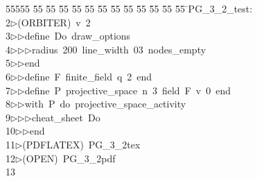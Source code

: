 %
%
\begin{tabbing}
55555 \= 55 \= 55 \= 55 \= 55 \= 55 \= 55 \= 55 \= 55 \= 55 \= 55 \= 55 \= 55 \= \>PG\_3\_2\_test:\\[0pt]
2\>$\triangleright$\>(ORBITER)\ v\ 2\ \\[0pt]
3\>$\triangleright$\>$\triangleright$\>define\ Do\ draw\_options\ \\[0pt]
4\>$\triangleright$\>$\triangleright$\>$\triangleright$\>radius\ 200\ line\_width\ 03\ nodes\_empty\ \\[0pt]
5\>$\triangleright$\>$\triangleright$\>end\ \\[0pt]
6\>$\triangleright$\>$\triangleright$\>define\ F\ finite\_field\ q\ 2\ end\ \\[0pt]
7\>$\triangleright$\>$\triangleright$\>define\ P\ projective\_space\ n\ 3\ field\ F\ v\ 0\ end\ \\[0pt]
8\>$\triangleright$\>$\triangleright$\>with\ P\ do\ projective\_space\_activity\ \\[0pt]
9\>$\triangleright$\>$\triangleright$\>$\triangleright$\>cheat\_sheet\ Do\ \\[0pt]
10\>$\triangleright$\>$\triangleright$\>end\\[0pt]
11\>$\triangleright$\>(PDFLATEX)\ PG\_3\_2tex\\[0pt]
12\>$\triangleright$\>(OPEN)\ PG\_3\_2pdf\\[0pt]
13\>\end{tabbing}
